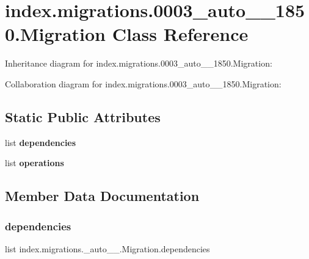 \hypertarget{classindex_1_1migrations_1_10003__auto__20171010__1850_1_1Migration}{}\section{index.\+migrations.0003\+\_\+auto\+\_\+\_\+1850.Migration Class Reference}
\label{classindex_1_1migrations_1_10003__auto__20171010__1850_1_1Migration}


Inheritance diagram for index.\+migrations.0003\+\_\+auto\+\_\+\_\+1850.Migration\+:


Collaboration diagram for index.\+migrations.0003\+\_\+auto\+\_\+\_\+1850.Migration\+:
\subsection*{Static Public Attributes}
\begin{DoxyCompactItemize}
\item 
list {\bfseries dependencies}
\item 
list {\bfseries operations}
\end{DoxyCompactItemize}


\subsection{Member Data Documentation}
\mbox{\label{classindex_1_1migrations_1_10003__auto__20171010__1850_1_1Migration_a967abc40c5868bb0bed0fe1a9a25eb94}} 
\subsubsection{\texorpdfstring{dependencies}{dependencies}}
{\footnotesize\ttfamily list index.\+migrations.\+\_\+auto\+\_\+\_.\+Migration.\+dependencies\hspace{0.3cm}{\ttfamily [static]}}


